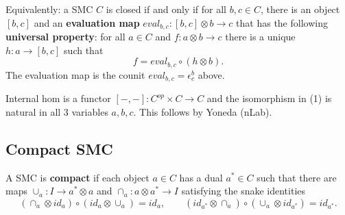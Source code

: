 \documentclass[12pt]{article}
\theoremstyle{definition}
\theoremstyle{remark}
\begin{document}
\medskip
\noindent
Equivalently: a SMC $C$ is closed if and only if for all $b,c\in C$, there is an object
$[b,c]$ and an \textbf{evaluation map} $eval_{b,c}: [b,c]\otimes b\to c$ that has the
following \textbf{universal property}: for all $a\in C$ and $f:a\otimes b\to c$ there is a
unique $h:a\to [b,c]$ such that
\[
f=eval_{b,c}\circ(h\otimes b).
\]
The evaluation map is the counit $eval_{b,c}=\epsilon^b_c$ above.

\medskip
\noindent
Internal hom is a functor $[-,-]: C^{op}\times C\to C$ and the isomorphism in
(1) is natural in all 3 variables $a,b,c$. This follows by  Yoneda (nLab).


\subsection{Compact SMC}

A SMC is \textbf{compact} if each object $a\in C$ has a dual $a^*\in C$ such that there
are maps $\cup_a: I\to a^*\otimes a$ and $\cap_a: a\otimes a^*\to I$ satisfying the snake
identities
\[
(\cap_a\otimes id_a)\circ (id_a\otimes \cup_a)=id_a,\qquad (id_{a^*}\otimes
\cap_a)\circ (\cup_a\otimes id_{a^*})=id_{a^*}.
\]
\end{document}
